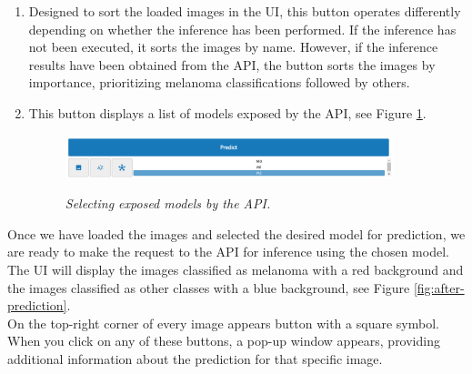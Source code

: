 \begin{enumerate}
  \item Designed to sort the loaded images in the UI, this button operates
    differently depending on whether the inference has been performed. If the
    inference has not been executed, it sorts the images by name. However, if
    the inference results have been obtained from the API, the button sorts the
    images by importance, prioritizing melanoma classifications followed by
    others.

  \item This button displays a list of models exposed by the API, see Figure
    \ref{fig:selecting-model}.


    \begin{figure}[H]
  \centering
  \includegraphics[width=0.9\textwidth]{imatges/results/selecting-model.png}
  \caption[Selecting exposed models by the API]{\textit{Selecting exposed models by the API. }}
  {\label{fig:selecting-model}}
\end{figure}

\end{enumerate}

Once we have loaded the images and selected the desired model for prediction,
we are ready to make the request to the API for inference using the chosen
model. The UI will display the images classified as melanoma with a red
background and the images classified as other classes with a blue background,
see Figure \ref{fig:after-prediction}. \\

On the top-right corner of every image appears button with a
square symbol. When you click on any of these buttons, a pop-up window appears,
providing additional information about the prediction for that specific image. \\

